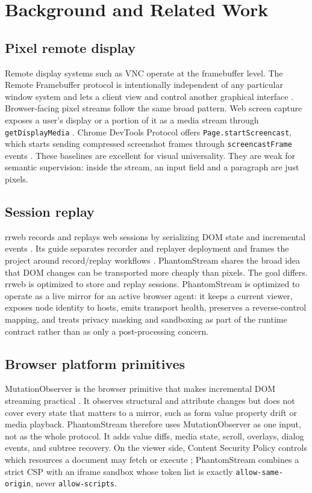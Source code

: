 \documentclass[conference]{IEEEtran}
\newcommand{\code}[1]{\texttt{\small #1}}
\begin{document}
\section{Background and Related Work}

\subsection{Pixel remote display}

Remote display systems such as VNC operate at the framebuffer level. The Remote
Framebuffer protocol is intentionally independent of any particular window
system and lets a client view and control another graphical interface
\cite{rfb}. Browser-facing pixel streams follow the same broad pattern. Web
screen capture exposes a user's display or a portion of it as a media stream
through \code{getDisplayMedia} \cite{screencapture}. Chrome DevTools Protocol
offers \code{Page.startScreencast}, which starts sending compressed screenshot
frames through \code{screencastFrame} events \cite{cdppage}. These baselines are
excellent for visual universality. They are weak for semantic supervision:
inside the stream, an input field and a paragraph are just pixels.

\subsection{Session replay}

rrweb records and replays web sessions by serializing DOM state and incremental
events \cite{rrweb}. Its guide separates recorder and replayer deployment and
frames the project around record/replay workflows \cite{rrwebguide}. PhantomStream
shares the broad idea that DOM changes can be transported more cheaply than
pixels. The goal differs. rrweb is optimized to store and replay sessions.
PhantomStream is optimized to operate as a live mirror for an active browser
agent: it keeps a current viewer, exposes node identity to hosts, emits
transport health, preserves a reverse-control mapping, and treats privacy
masking and sandboxing as part of the runtime contract rather than as only a
post-processing concern.

\subsection{Browser platform primitives}

MutationObserver is the browser primitive that makes incremental DOM streaming
practical \cite{domstandard}. It observes structural and attribute changes but
does not cover every state that matters to a mirror, such as form value property
drift or media playback. PhantomStream therefore uses MutationObserver as one
input, not as the whole protocol. It adds value diffs, media state, scroll,
overlays, dialog events, and subtree recovery. On the viewer side, Content
Security Policy controls which resources a document may fetch or execute
\cite{csp3}; PhantomStream combines a strict CSP with an iframe sandbox whose
token list is exactly \code{allow-same-origin}, never \code{allow-scripts}.
\end{document}
